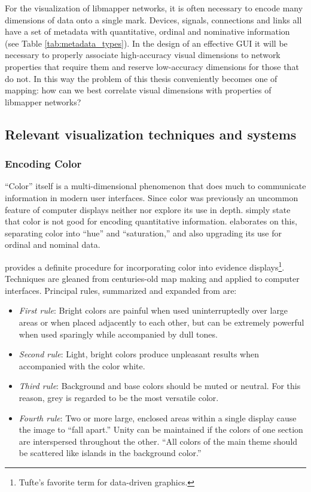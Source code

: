 For the visualization of libmapper networks, it is often necessary to encode many dimensions of data onto a single mark. Devices, signals, connections and links all have a set of metadata with quantitative, ordinal and nominative information (see Table \ref{tab:metadata_types}). In the design of an effective GUI it will be necessary to properly associate high-accuracy visual dimensions to network properties that require them and reserve low-accuracy dimensions for those that do not. In this way the problem of this thesis conveniently becomes one of mapping: how can we best correlate visual dimensions with properties of libmapper networks?

\subsection{Relevant visualization techniques and systems}
	\label{sec:color}

	\subsubsection{Encoding Color}

``Color'' itself is a multi-dimensional phenomenon that does much to communicate information in modern user interfaces. Since color was previously an uncommon feature of computer displays neither  nor  explore its use in depth.  simply state that color is not good for encoding quantitative information.  elaborates on this, separating color into ``hue'' and ``saturation,'' and also upgrading its use for ordinal and nominal data. 

 provides a definite procedure for incorporating color into evidence displays\footnote{Tufte's favorite term for data-driven graphics.}. Techniques are gleaned from centuries-old map making and applied to computer interfaces. Principal rules, summarized and expanded from  are:

	\begin{itemize}
		\item \emph{First rule}: Bright colors are painful when used uninterruptedly over large areas or when placed adjacently to each other, but can be extremely powerful when used sparingly while accompanied by dull tones.
		\item \emph{Second rule}: Light, bright colors produce unpleasant results when accompanied with the color white.
		\item \emph{Third rule}: Background and base colors should be muted or neutral. For this reason, grey is regarded to be the most versatile color.
		\item \emph{Fourth rule}: Two or more large, enclosed areas within a single display cause the image to ``fall apart.'' Unity can be maintained if the colors of one section are interspersed throughout the other. ``All colors of the main theme should be scattered like islands in the background color.''
	\end{itemize}

